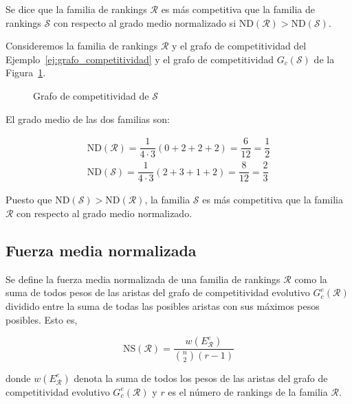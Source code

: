 \begin{defi}
Se dice que la familia de rankings $\mathcal{R}$ es más competitiva que la familia de rankings $\mathcal{S}$ con respecto al grado medio normalizado si $\mathrm{ND}(\mathcal{R}) > \mathrm{ND}(\mathcal{S})$.
\end{defi}

\begin{ejemplo}
Consideremos la familia de rankings $\mathcal{R}$ y el grafo de competitividad del Ejemplo~\ref{ej:grafo_competitividad} y el grafo de competitividad $G_c(\mathcal{S})$ de la Figura~\ref{fig:grado_medio}.\\

\begin{figure}[htb]
\centering
\ejemplogradomedio
\caption{Grafo de competitividad de $\mathcal{S}$}
\label{fig:grado_medio}
\end{figure}

El grado medio de las dos familias son:

\begin{eqnarray*}
\mathrm{ND}(\mathcal{R}) = \dfrac{1}{4\cdot 3} (0 + 2 + 2 + 2) = \dfrac{6}{12} = \dfrac{1}{2}\\
\mathrm{ND}(\mathcal{S}) = \dfrac{1}{4\cdot 3} (2 + 3 + 1 + 2) = \dfrac{8}{12} = \dfrac{2}{3}
\end{eqnarray*}

Puesto que $\mathrm{ND}(\mathcal{S}) > \mathrm{ND}(\mathcal{R})$, la familia $\mathcal{S}$ es más competitiva que la familia $\mathcal{R}$ con respecto al grado medio normalizado.
\end{ejemplo}

\subsection*{Fuerza media normalizada}

\begin{defi}
Se define la fuerza media normalizada de una familia de rankings $\mathcal{R}$ como la suma de todos pesos de las aristas del grafo de competitividad evolutivo $G_c^e(\mathcal{R})$ dividido entre la suma de todas las posibles aristas con sus máximos pesos posibles. Esto es,

\begin{equation}
\mathrm{NS}(\mathcal{R}) = \dfrac{w(E_\mathcal{R}^e)}{\binom{n}{2} (r-1)}
\end{equation} 

donde $w(E_\mathcal{R}^e)$ denota la suma de todos los pesos de las aristas del grafo de competitividad evolutivo $G_c^e(\mathcal{R})$ y $r$ es el número de rankings de la familia $\mathcal{R}$.
\end{defi}

